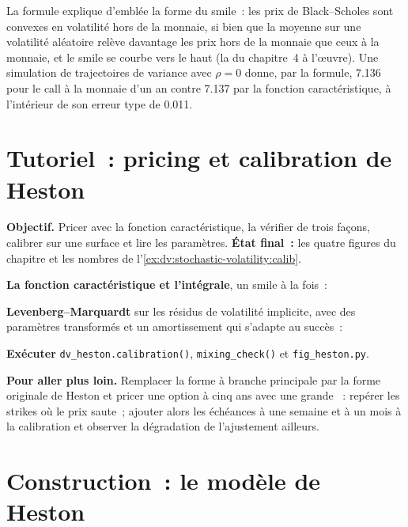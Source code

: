 La formule explique d'emblée la forme du smile~: les prix de Black--Scholes sont convexes en volatilité hors de
la monnaie, si bien que la moyenne sur une volatilité aléatoire relève davantage les prix hors de la monnaie que ceux à la monnaie,
et le smile se courbe vers le haut (la  du chapitre~4 à l'œuvre). Une simulation de trajectoires de variance avec
$\rho=0$ donne, par la formule, 7.136 pour le call à la monnaie d'un an contre 7.137 par la
fonction caractéristique, à l'intérieur de son erreur type de 0.011.

\section{Tutoriel~: pricing et calibration de Heston}\label{tut:dv:stochastic-volatility:tut}

\begin{tutorial}
\textbf{Objectif.} Pricer avec la fonction caractéristique, la vérifier de trois façons, calibrer sur une surface et lire
les paramètres. \textbf{État final~:} les quatre figures du chapitre et les nombres de
l'\cref{ex:dv:stochastic-volatility:calib}.
\begin{tutsteps}
\item \textbf{La fonction caractéristique et l'intégrale}, un smile à la fois~:
\label{lst:dv:stochastic-volatility:cf}
\item \textbf{Levenberg--Marquardt} sur les résidus de volatilité implicite, avec des paramètres transformés et un
amortissement qui s'adapte au succès~:
\label{lst:dv:stochastic-volatility:calib}
\item \textbf{Exécuter} \texttt{dv\_heston.calibration()}, \texttt{mixing\_check()} et \texttt{fig\_heston.py}.
\end{tutsteps}
\textbf{Pour aller plus loin.} Remplacer la forme à branche principale par la forme originale de Heston et pricer une
option à cinq ans avec une grande ~: repérer les strikes où le prix saute~; ajouter alors les échéances à une semaine et
à un mois à la calibration et observer la dégradation de l'ajustement ailleurs.
\end{tutorial}

\section{Construction~: le modèle de Heston}\label{bld:dv:stochastic-volatility:heston}

